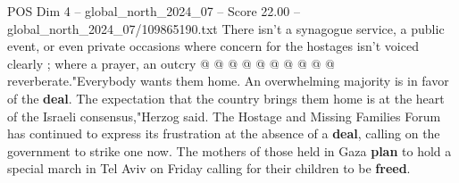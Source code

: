 \begin{textsample}{POS Dim 4 – global\_north\_2024\_07 – Score 22.00 – global\_north\_2024\_07/109865190.txt}
There isn't a synagogue service, a public event, or even private occasions where concern for the hostages isn't voiced clearly ; where a prayer, an outcry @ @ @ @ @ @ @ @ @ @ reverberate."Everybody wants them home.
An overwhelming majority is in favor of the \textbf{deal}.
The expectation that the country brings them home is at the heart of the Israeli consensus,"Herzog said.
The Hostage and Missing Families Forum has continued to express its frustration at the absence of a \textbf{deal}, calling on the government to strike one now.
The mothers of those held in Gaza \textbf{plan} to hold a special march in Tel Aviv on Friday calling for their children to be \textbf{freed}.

\end{textsample}
